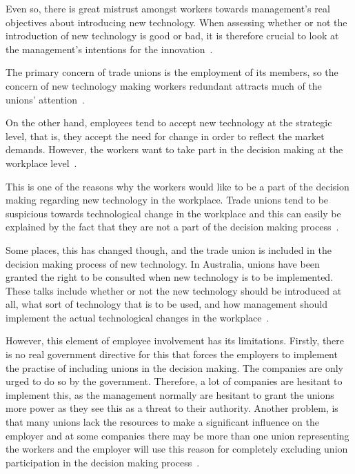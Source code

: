 \documentclass[a4paper,12pt,titlepage]{article}
\begin{document}
  Even so, there is great mistrust amongst workers towards management's
  real objectives about introducing new technology. When assessing
  whether or not the introduction of new technology is good or bad, it is therefore
  crucial to look at the management's intentions for the innovation~\cite[153]{jw}.

  The primary concern of trade unions is the
  employment of its members, so the concern of new technology
  making workers redundant attracts much of the
  unions' attention~\cite[10]{bl}.

  On the other hand, employees tend to accept new technology at the strategic
  level, that is, they accept the need for change in order to
  reflect the market demands. However, the workers want to
  take part in the decision making at the workplace
  level~\cite[131]{vz}.

  This is one of the reasons why the workers would like to
  be a part of the decision making regarding new technology in
  the workplace. Trade unions tend to be suspicious towards
  technological change in the workplace and this can easily be
  explained by the fact that they are not a part of the decision
  making process~\cite[11-12]{bl}.

  Some places, this has changed though, and the trade union
  is included in the decision making process of new technology.  
  In Australia, unions have been granted the right to
  be consulted when new technology is to be implemented. These
  talks include whether or not the new technology should be
  introduced at all, what sort of technology that is to be used,
  and how management should implement the actual technological changes
  in the workplace~\cite[100-111]{dl}.

  However, this element of employee involvement has its limitations.
  Firstly, there is no real government directive for this that forces the employers to
  implement the practise of including unions in the decision
  making. The companies are only urged to do so by the government.
  Therefore, a lot of companies are hesitant to implement this,
  as the management normally are hesitant to grant the unions more power
  as they see this as a threat to their authority. Another problem,
  is that many unions lack the resources to make a significant
  influence on the employer and at some companies there
  may be more than one union representing the workers and the
  employer will use this reason for completely excluding union participation
  in the decision making process~\cite[111-115]{dl}.
\end{document}
